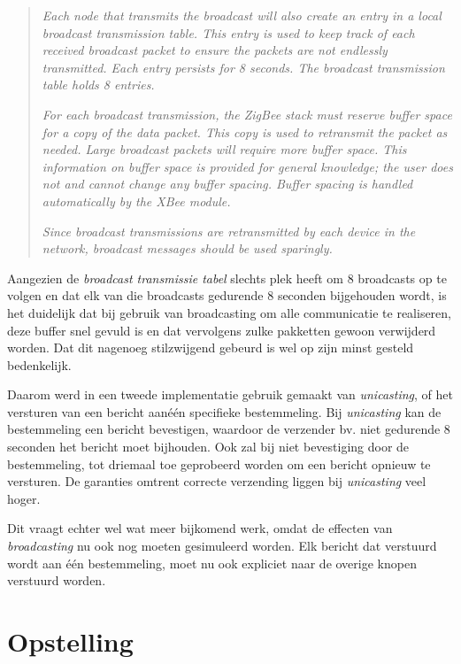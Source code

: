 \begin{quote}

\emph{Each node that transmits the broadcast will also create an entry in a
local broadcast transmission table. This entry is used to keep track of each
received broadcast packet to ensure the packets are not endlessly transmitted.
Each entry persists for 8 seconds. The broadcast transmission table holds 8
entries.}

\emph{For each broadcast transmission, the ZigBee stack must reserve buffer
space for a copy of the data packet. This copy is used to retransmit the packet
as needed. Large broadcast packets will require more buffer space. This
information on buffer space is provided for general knowledge; the user does
not and cannot change any buffer spacing. Buffer spacing is handled
automatically by the XBee module.}

\emph{Since broadcast transmissions are retransmitted by each device in the
network, broadcast messages should be used sparingly.}

\end{quote}

Aangezien de \emph{broadcast transmissie tabel} slechts plek heeft om 8
broadcasts op te volgen en dat elk van die broadcasts gedurende 8 seconden
bijgehouden wordt, is het duidelijk dat bij gebruik van broadcasting om alle
communicatie te realiseren, deze buffer snel gevuld is en dat vervolgens zulke
pakketten gewoon verwijderd worden. Dat dit nagenoeg stilzwijgend gebeurd is
wel op zijn minst gesteld bedenkelijk.

Daarom werd in een tweede implementatie gebruik gemaakt van \emph{unicasting},
of het versturen van een bericht aan\'e\'en specifieke bestemmeling. Bij
\emph{unicasting} kan de bestemmeling een bericht bevestigen, waardoor de
verzender bv. niet gedurende 8 seconden het bericht moet bijhouden. Ook zal bij
niet bevestiging door de bestemmeling, tot driemaal toe geprobeerd worden om
een bericht opnieuw te versturen. De garanties omtrent correcte verzending
liggen bij \emph{unicasting} veel hoger.

Dit vraagt echter wel wat meer bijkomend werk, omdat de effecten van
\emph{broadcasting} nu ook nog moeten gesimuleerd worden. Elk bericht dat
verstuurd wordt aan \'e\'en bestemmeling, moet nu ook expliciet naar de overige
knopen verstuurd worden.

\section{Opstelling}

